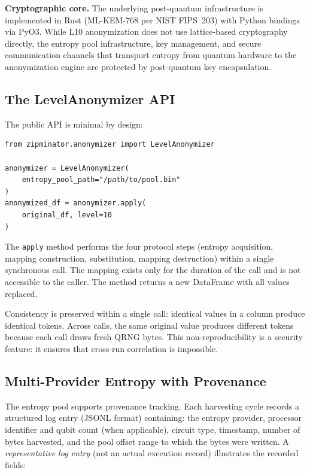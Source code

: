 \documentclass[journal]{IEEEtran}
\begin{document}
\textbf{Cryptographic core.} The underlying post-quantum infrastructure is implemented in Rust (ML-KEM-768 per NIST FIPS~203) with Python bindings via PyO3. While L10 anonymization does not use lattice-based cryptography directly, the entropy pool infrastructure, key management, and secure communication channels that transport entropy from quantum hardware to the anonymization engine are protected by post-quantum key encapsulation.

\subsection{The LevelAnonymizer API}
\label{subsec:api}

The public API is minimal by design:

{\footnotesize\begin{verbatim}
from zipminator.anonymizer import LevelAnonymizer

anonymizer = LevelAnonymizer(
    entropy_pool_path="/path/to/pool.bin"
)
anonymized_df = anonymizer.apply(
    original_df, level=10
)
\end{verbatim}}

The \texttt{apply} method performs the four protocol steps (entropy acquisition, mapping construction, substitution, mapping destruction) within a single synchronous call. The mapping exists only for the duration of the call and is not accessible to the caller. The method returns a new DataFrame with all values replaced.

Consistency is preserved within a single call: identical values in a column produce identical tokens. Across calls, the same original value produces different tokens because each call draws fresh QRNG bytes. This non-reproducibility is a security feature: it ensures that cross-run correlation is impossible.

\subsection{Multi-Provider Entropy with Provenance}
\label{subsec:provenance}

The entropy pool supports provenance tracking. Each harvesting cycle records a structured log entry (JSONL format) containing: the entropy provider, processor identifier and qubit count (when applicable), circuit type, timestamp, number of bytes harvested, and the pool offset range to which the bytes were written. A \emph{representative log entry} (not an actual execution record) illustrates the recorded fields:
\end{document}
